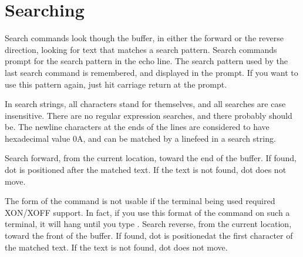 \section{Searching}
Search commands look though the buffer, in either the forward or the reverse
direction, looking for text that matches a search pattern. Search commands
prompt for the search pattern in the echo line. The search pattern used
by the last search command is remembered, and displayed in the prompt. If
you want to use this pattern again, just hit carriage return at the
prompt.

In search strings, all characters stand for themselves, and all searches
are case insensitive. There are no regular expression searches, and there
probably should be. The newline characters at the ends of the lines are
considered to have hexadecimal value 0A, and can be matched by a linefeed
in a search string.
\begin{cmdlist}
Search forward, from the current location, toward the end of
the buffer. If found, dot is positioned after the matched text. If the
text is not found, dot does not move.

The  form of the command is not usable if the terminal being used
required XON/XOFF support. In fact, if you use this format of the command
on such a terminal, it will hang until you type .
Search reverse, from the current location, toward the front of
the buffer. If found, dot is positionedat the first character of the
matched text. If the text is not found, dot does not move.
\end{cmdlist}
